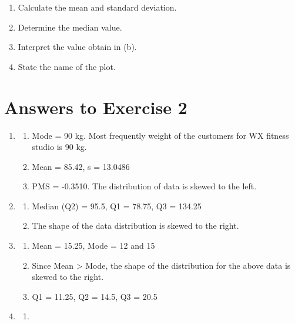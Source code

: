 \documentclass[
  a4paper,
  DIV=11,
  numbers=noendperiod,
  oneside]{scrreprt}
\providecommand{\tightlist}{%
  \setlength{\itemsep}{0pt}\setlength{\parskip}{0pt}}\usepackage{longtable,booktabs,array}
\begin{document}
\begin{enumerate}
\def\labelenumi{\alph{enumi}.}
\tightlist
\item
  Calculate the mean and standard deviation.
\item
  Determine the median value.
\item
  Interpret the value obtain in (b).
\item
  State the name of the plot.
\end{enumerate}

\hypertarget{answers-to-exercise-2}{%
\section{Answers to Exercise 2}\label{answers-to-exercise-2}}

\begin{enumerate}
\def\labelenumi{\arabic{enumi}.}
\item
  \begin{enumerate}
  \def\labelenumii{\alph{enumii})}
  \tightlist
  \item
    Mode = 90 kg. Most frequently weight of the customers for WX fitness
    studio is 90 kg.
  \item
    Mean = 85.42, s = 13.0486
  \item
    PMS = -0.3510. The distribution of data is skewed to the left.
  \end{enumerate}
\item
  \begin{enumerate}
  \def\labelenumii{\alph{enumii})}
  \tightlist
  \item
    Median (Q2) = 95.5, Q1 = 78.75, Q3 = 134.25
  \item
    The shape of the data distribution is skewed to the right.
  \end{enumerate}
\item
  \begin{enumerate}
  \def\labelenumii{\alph{enumii})}
  \tightlist
  \item
    Mean = 15.25, Mode = 12 and 15
  \item
    Since Mean \textgreater{} Mode, the shape of the distribution for
    the above data is skewed to the right.
  \item
    Q1 = 11.25, Q2 = 14.5, Q3 = 20.5
  \end{enumerate}
\item
  \begin{enumerate}
  \def\labelenumii{\alph{enumii})}
  \tightlist
  \item

\end{enumerate}
\end{enumerate}
\end{document}
